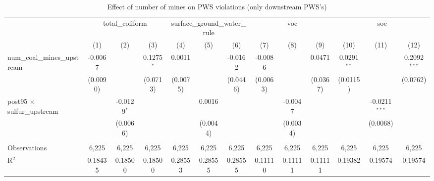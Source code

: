 
\begin{table}[htbp]
   \caption{\label{olsrf2sls_nummine_non_mine_vio_binary_1985to2005dwnstrm} Effect of number of mines on PWS violations (only downstream PWS's)}
   \bigskip
   \centering
   \begin{adjustbox}{width = \textwidth, center}
      \begin{tabular}{lcccccccccccc}
         \toprule
          & \multicolumn{3}{c}{total\_coliform} & \multicolumn{3}{c}{surface\_ground\_water\_rule} & \multicolumn{3}{c}{voc} & \multicolumn{3}{c}{soc}\\
                                                           & (1)           & (2)           & (3)           & (4)                   & (5)                   & (6)                   & (7)           & (8)           & (9)           & (10)          & (11)            & (12)\\  
         \midrule 
         num\_coal\_mines\_upstream                        & -0.0067       &               & 0.1275$^{*}$  & 0.0011                &                       & -0.0162               & -0.0086       &               & 0.0471        & 0.0291$^{**}$ &                 & 0.2092$^{***}$\\   
                                                           & (0.0090)      &               & (0.0713)      & (0.0075)              &                       & (0.0446)              & (0.0063)      &               & (0.0367)      & (0.0115)      &                 & (0.0762)\\   
         post95 $\times$ sulfur\_upstream                  &               & -0.0129$^{*}$ &               &                       & 0.0016                &                       &               & -0.0047       &               &               & -0.0211$^{***}$ &   \\   
                                                           &               & (0.0066)      &               &                       & (0.0044)              &                       &               & (0.0034)      &               &               & (0.0068)        &   \\   
          \\
         Observations                                      & 6,225         & 6,225         & 6,225         & 6,225                 & 6,225                 & 6,225                 & 6,225         & 6,225         & 6,225         & 6,225         & 6,225           & 6,225\\  
         R$^2$                                             & 0.18435       & 0.18500       & 0.18500       & 0.28553               & 0.28555               & 0.28555               & 0.11110       & 0.11111       & 0.11111       & 0.19382       & 0.19574         & 0.19574\\  

\end{tabular}
\end{adjustbox}
\end{table}
